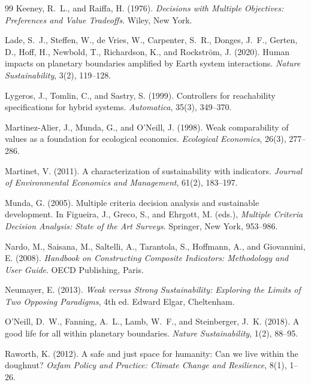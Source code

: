 \documentclass[preprint,11pt,authoryear]{elsarticle}
\theoremstyle{definition}
\theoremstyle{remark}
\begin{document}
\begin{thebibliography}{99}
 Keeney, R.~L., and Raiffa, H. (1976). \emph{Decisions with Multiple Objectives: Preferences and Value Tradeoffs}. Wiley, New York.

 Lade, S.~J., Steffen, W., de Vries, W., Carpenter, S.~R., Donges, J.~F., Gerten, D., Hoff, H., Newbold, T., Richardson, K., and Rockstr\"om, J. (2020). Human impacts on planetary boundaries amplified by Earth system interactions. \emph{Nature Sustainability}, 3(2), 119--128.

 Lygeros, J., Tomlin, C., and Sastry, S. (1999). Controllers for reachability specifications for hybrid systems. \emph{Automatica}, 35(3), 349--370.

 Martinez-Alier, J., Munda, G., and O'Neill, J. (1998). Weak comparability of values as a foundation for ecological economics. \emph{Ecological Economics}, 26(3), 277--286.

 Martinet, V. (2011). A characterization of sustainability with indicators. \emph{Journal of Environmental Economics and Management}, 61(2), 183--197.

 Munda, G. (2005). Multiple criteria decision analysis and sustainable development. In Figueira, J., Greco, S., and Ehrgott, M. (eds.), \emph{Multiple Criteria Decision Analysis: State of the Art Surveys}. Springer, New York, 953--986.

 Nardo, M., Saisana, M., Saltelli, A., Tarantola, S., Hoffmann, A., and Giovannini, E. (2008). \emph{Handbook on Constructing Composite Indicators: Methodology and User Guide}. OECD Publishing, Paris.

 Neumayer, E. (2013). \emph{Weak versus Strong Sustainability: Exploring the Limits of Two Opposing Paradigms}, 4th ed. Edward Elgar, Cheltenham.

 O'Neill, D.~W., Fanning, A.~L., Lamb, W.~F., and Steinberger, J.~K. (2018). A good life for all within planetary boundaries. \emph{Nature Sustainability}, 1(2), 88--95.

 Raworth, K. (2012). A safe and just space for humanity: Can we live within the doughnut? \emph{Oxfam Policy and Practice: Climate Change and Resilience}, 8(1), 1--26.


\end{thebibliography}
\end{document}
